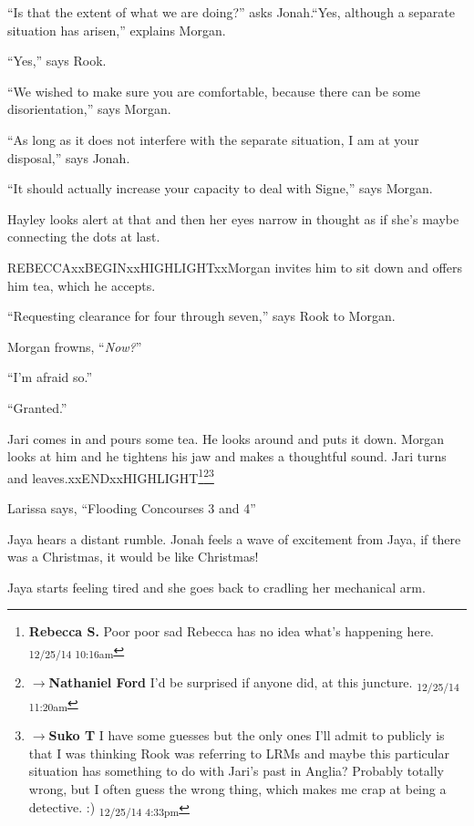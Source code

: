 ``Is that the extent of what we are doing?'' asks Jonah.``Yes, although a separate situation has arisen,'' explains Morgan.

``Yes,'' says Rook.

``We wished to make sure you are comfortable, because there can be some disorientation,'' says Morgan.

``As long as it does not interfere with the separate situation, I am at your disposal,'' says Jonah.

``It should actually increase your capacity to deal with Signe,'' says Morgan. 

Hayley looks alert at that and then her eyes narrow in thought as if she's maybe connecting the dots at last.



REBECCAxxBEGINxxHIGHLIGHTxxMorgan invites him to sit down and offers him tea, which he accepts.

``Requesting clearance for four through seven,'' says Rook to Morgan.

Morgan frowns, ``\textit{Now?}''

``I'm afraid so.''

``Granted.''



Jari comes in and pours some tea.  He looks around and puts it down.  Morgan looks at him and he tightens his jaw and makes a thoughtful sound.  Jari turns and leaves.xxENDxxHIGHLIGHT\footnote{\textbf{Rebecca S. }Poor poor sad Rebecca has no idea what's happening here. \textsubscript{12/25/14 10:16am}}\footnote{$\rightarrow$\textbf{Nathaniel Ford }I'd be surprised if anyone did, at this juncture. \textsubscript{12/25/14 11:20am}}\footnote{$\rightarrow$\textbf{Suko T }I have some guesses but the only ones I'll admit to publicly is that I was thinking Rook was referring to LRMs and maybe this particular situation has something to do with Jari's past in Anglia?  Probably totally wrong, but I often guess the wrong thing, which makes me crap at being a detective. :) \textsubscript{12/25/14 4:33pm}}



Larissa says, ``Flooding Concourses 3 and 4''





Jaya hears a distant rumble.  Jonah feels a wave of excitement from Jaya, if there was a Christmas, it would be like Christmas!

Jaya starts feeling tired and she goes back to cradling her mechanical arm.

